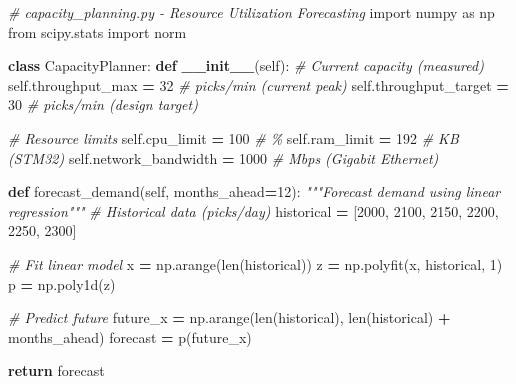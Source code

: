 \documentclass[
]{article}
\newenvironment{Shaded}{\begin{snugshade}}{\end{snugshade}}
\newcommand{\BuiltInTok}[1]{#1}
\newcommand{\CommentTok}[1]{\textcolor[rgb]{0.56,0.35,0.01}{\textit{#1}}}
\newcommand{\ControlFlowTok}[1]{\textcolor[rgb]{0.13,0.29,0.53}{\textbf{#1}}}
\newcommand{\DecValTok}[1]{\textcolor[rgb]{0.00,0.00,0.81}{#1}}
\newcommand{\FunctionTok}[1]{\textcolor[rgb]{0.13,0.29,0.53}{\textbf{#1}}}
\newcommand{\ImportTok}[1]{#1}
\newcommand{\KeywordTok}[1]{\textcolor[rgb]{0.13,0.29,0.53}{\textbf{#1}}}
\newcommand{\NormalTok}[1]{#1}
\newcommand{\OperatorTok}[1]{\textcolor[rgb]{0.81,0.36,0.00}{\textbf{#1}}}
\newcommand{\VariableTok}[1]{\textcolor[rgb]{0.00,0.00,0.00}{#1}}
\begin{document}
\begin{Shaded}
\begin{Highlighting}[]
\CommentTok{\# capacity\_planning.py {-} Resource Utilization Forecasting}
\ImportTok{import}\NormalTok{ numpy }\ImportTok{as}\NormalTok{ np}
\ImportTok{from}\NormalTok{ scipy.stats }\ImportTok{import}\NormalTok{ norm}

\KeywordTok{class}\NormalTok{ CapacityPlanner:}
    \KeywordTok{def} \FunctionTok{\_\_init\_\_}\NormalTok{(}\VariableTok{self}\NormalTok{):}
        \CommentTok{\# Current capacity (measured)}
        \VariableTok{self}\NormalTok{.throughput\_max }\OperatorTok{=} \DecValTok{32}  \CommentTok{\# picks/min (current peak)}
        \VariableTok{self}\NormalTok{.throughput\_target }\OperatorTok{=} \DecValTok{30}  \CommentTok{\# picks/min (design target)}

        \CommentTok{\# Resource limits}
        \VariableTok{self}\NormalTok{.cpu\_limit }\OperatorTok{=} \DecValTok{100}  \CommentTok{\# \%}
        \VariableTok{self}\NormalTok{.ram\_limit }\OperatorTok{=} \DecValTok{192}  \CommentTok{\# KB (STM32)}
        \VariableTok{self}\NormalTok{.network\_bandwidth }\OperatorTok{=} \DecValTok{1000}  \CommentTok{\# Mbps (Gigabit Ethernet)}

    \KeywordTok{def}\NormalTok{ forecast\_demand(}\VariableTok{self}\NormalTok{, months\_ahead}\OperatorTok{=}\DecValTok{12}\NormalTok{):}
        \CommentTok{"""Forecast demand using linear regression"""}
        \CommentTok{\# Historical data (picks/day)}
\NormalTok{        historical }\OperatorTok{=}\NormalTok{ [}\DecValTok{2000}\NormalTok{, }\DecValTok{2100}\NormalTok{, }\DecValTok{2150}\NormalTok{, }\DecValTok{2200}\NormalTok{, }\DecValTok{2250}\NormalTok{, }\DecValTok{2300}\NormalTok{]}

        \CommentTok{\# Fit linear model}
\NormalTok{        x }\OperatorTok{=}\NormalTok{ np.arange(}\BuiltInTok{len}\NormalTok{(historical))}
\NormalTok{        z }\OperatorTok{=}\NormalTok{ np.polyfit(x, historical, }\DecValTok{1}\NormalTok{)}
\NormalTok{        p }\OperatorTok{=}\NormalTok{ np.poly1d(z)}

        \CommentTok{\# Predict future}
\NormalTok{        future\_x }\OperatorTok{=}\NormalTok{ np.arange(}\BuiltInTok{len}\NormalTok{(historical), }\BuiltInTok{len}\NormalTok{(historical) }\OperatorTok{+}\NormalTok{ months\_ahead)}
\NormalTok{        forecast }\OperatorTok{=}\NormalTok{ p(future\_x)}

        \ControlFlowTok{return}\NormalTok{ forecast}


\end{Highlighting}
\end{Shaded}
\end{document}
